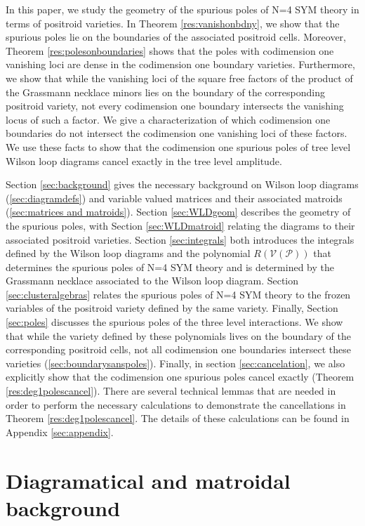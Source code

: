 \documentclass[11pt]{article}
\newcommand{\cP}{\mathcal{P}}
\newcommand{\cV}{\mathcal{V}}
\newcommand{\VP}{\cV(\cP)}
\theoremstyle{remark}
\theoremstyle{definition}
\begin{document}
In this paper, we study the geometry of the spurious poles of N=4 SYM theory in terms of positroid varieties. In Theorem \ref{res:vanishonbdny}, we show that the spurious poles lie on the boundaries of the associated positroid cells. Moreover, Theorem \ref{res:polesonboundaries} shows that the poles with codimension one vanishing loci are dense in the codimension one boundary varieties. Furthermore, we show that while the vanishing loci of the square free factors of the product of the Grassmann necklace minors lies on the boundary of the corresponding positroid variety, not every codimension one boundary intersects the vanishing locus of such a factor. We give a characterization of which codimension one boundaries do not intersect the codimension one vanishing loci of these factors. We use these facts to show that the codimension one spurious poles of tree level Wilson loop diagrams cancel exactly in the tree level amplitude. 

Section \ref{sec:background} gives the necessary background on Wilson loop diagrams (\ref{sec:diagramdefs}) and variable valued matrices and their associated matroids (\ref{sec:matrices and matroids}). Section \ref{sec:WLDgeom} describes the geometry of the spurious poles, with Section \ref{sec:WLDmatroid} relating the diagrams to their associated positroid varieties. Section \ref{sec:integrals} both introduces the integrals defined by the Wilson loop diagrams and the polynomial $R(\VP)$ that determines the spurious poles of N=4 SYM theory and is determined by the Grassmann necklace associated to the Wilson loop diagram. Section \ref{sec:clusteralgebras} relates the spurious poles of N=4 SYM theory to the frozen variables of the positroid variety defined by the same variety. Finally, Section \ref{sec:poles} discusses the spurious poles of the three level interactions. We show that while the variety defined by these polynomials lives on the boundary of the corresponding positroid cells, not all codimension one boundaries intersect these varieties (\ref{sec:boundarysanspoles}). Finally, in section \ref{sec:cancelation}, we also explicitly show that the codimension one spurious poles cancel exactly (Theorem \ref{res:deg1polescancel}). There are several technical lemmas that are needed in order to perform the necessary calculations to demonstrate the cancellations in  Theorem \ref{res:deg1polescancel}. The details of these calculations can be found in Appendix \ref{sec:appendix}.
 

\section{Diagramatical and matroidal background \label{sec:background}}
\end{document}
